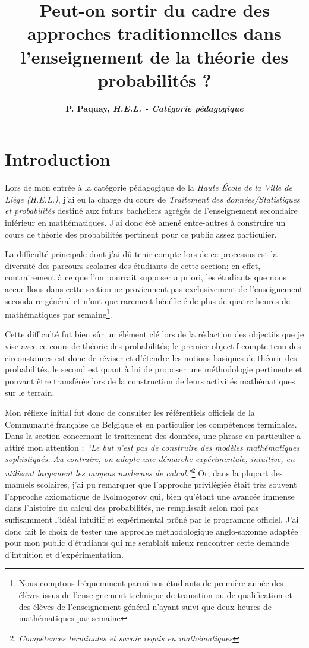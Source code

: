 \documentclass[11pt,a4paper]{article}
\title{\textbf{Peut-on sortir du cadre des approches traditionnelles dans l'enseignement de la théorie des probabilités ?}}
\author{\textbf{P. Paquay, \textsl{H.E.L. - Catégorie pédagogique}}}
\date{}
\begin{document}
\maketitle

\section{Introduction}

Lors de mon entrée à la catégorie pédagogique de la \textsl{Haute École de la Ville de Liège (H.E.L.)}, j'ai eu la charge du cours de \textit{Traitement des données/Statistiques et probabilités} destiné aux futurs bacheliers agrégés de l'enseignement secondaire inférieur en mathématiques. J'ai donc été amené entre-autres à construire un cours de théorie des probabilités pertinent pour ce public assez particulier.

La difficulté principale dont j'ai dû tenir compte lors de ce processus est la diversité des parcours scolaires des étudiants de cette section; en effet, contrairement à ce que l'on pourrait supposer a priori, les étudiants que nous accueillons dans cette section ne proviennent pas exclusivement de l'enseignement secondaire général et n'ont que rarement bénéficié de plus de quatre heures de mathématiques par semaine\footnote{Nous comptons fréquemment parmi nos étudiants de première année des élèves issus de l'enseignement technique de transition ou de qualification et des élèves de l'enseignement général n'ayant suivi que deux heures de mathématiques par semaine}.

Cette difficulté fut bien sûr un élément clé lors de la rédaction des objectifs que je vise avec ce cours de théorie des probabilités; le premier objectif compte tenu des circonstances est donc de réviser et d'étendre les notions basiques de théorie des probabilités, le second est quant à lui de proposer une méthodologie pertinente et pouvant être transférée lors de la construction de leurs activités mathématiques sur le terrain.

Mon réflexe initial fut donc de consulter les référentiels officiels de la Communauté française de Belgique et en particulier les compétences terminales. Dans la section concernant le traitement des données, une phrase en particulier a attiré mon attention :
\textit{``Le but n'est pas de construire des modèles mathématiques sophistiqués. Au contraire, on adopte une démarche expérimentale,
intuitive, en utilisant largement les moyens modernes de calcul.''}\footnote{\textit{Compétences terminales et savoir requis en mathématiques}}
Or, dans la plupart des manuels scolaires, j'ai pu remarquer que l'approche privilégiée était très souvent l'approche axiomatique de Kolmogorov qui, bien qu'étant une avancée immense dans l'histoire du calcul des probabilités, ne remplissait selon moi pas suffisamment l'idéal intuitif et expérimental prôné par le programme officiel. J'ai donc fait le choix de tester une approche méthodologique anglo-saxonne adaptée pour mon public d'étudiants qui me semblait mieux rencontrer cette demande d'intuition et d'expérimentation.
\end{document}
